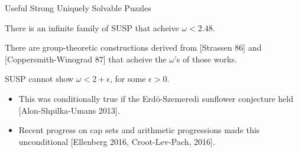 \documentclass[t,10pt,
mathserif,xcolor=dvipsnames]{beamer}
\begin{document}
\begin{myframe}{Useful Strong Uniquely Solvable Puzzles}

  \begin{lemma}
   There is an infinite family of SUSP that acheive $\omega < 2.48$.
  \end{lemma}

  \medskip
  There are group-theoretic constructions derived from [Strassen 86]
  and [Coppersmith-Winograd 87] that acheive the $\omega$'s of those
  works.

  \bigskip
  
  \begin{lemma}[{[BCCGU 16]}]
  SUSP cannot show $\omega < 2 + \epsilon$, for some $\epsilon >
  0$.
  \end{lemma}
  \begin{itemize}
  \item This was conditionally true if the Erd\"{o}-Szemeredi
    sunflower conjecture held [Alon-Shpilka-Umans 2013].
  \item Recent progress on cap sets and arithmetic progressions made
    this unconditional [Ellenberg 2016, Croot-Lev-Pach, 2016].
  \end{itemize}

  
\end{myframe}
\end{document}
